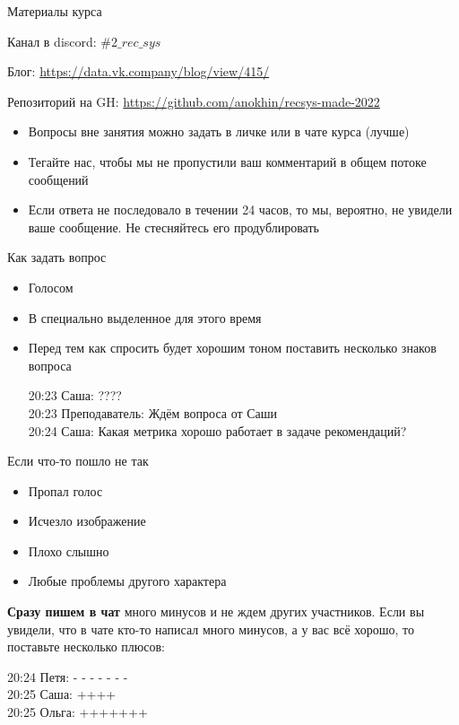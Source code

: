 \documentclass[11pt,aspectratio=169,handout]{beamer}
\begin{document}
\begin{frame}{Материалы курса}

Канал в discord: $\#2\_rec\_sys$

Блог: \url{https://data.vk.company/blog/view/415/}

Репозиторий на GH: \url{https://github.com/anokhin/recsys-made-2022}

\vfill

\begin{itemize}
\item Вопросы вне занятия можно задать в личке или в чате курса (лучше)
\item Тегайте нас, чтобы мы не пропустили ваш комментарий в общем потоке сообщений
\item Если ответа не последовало в течении 24 часов, то мы, вероятно, не увидели ваше сообщение. Не стесняйтесь его продублировать
\end{itemize}

\end{frame}

\begin{frame}{Как задать вопрос}

\begin{itemize}
\item Голосом
\item В специально выделенное для этого время
\item Перед тем как спросить будет хорошим тоном поставить несколько знаков вопроса
\begin{tcolorbox}[colback=gray!5,colframe=gray!80,title=]
20:23 Саша: ???? \\
20:23 Преподаватель: Ждём вопроса от Саши \\
20:24 Саша: Какая метрика хорошо работает в задаче рекомендаций?
\end{tcolorbox}
\end{itemize}

\end{frame}

\begin{frame}{Если что-то пошло не так}

\begin{itemize}
\item Пропал голос
\item Исчезло изображение
\item Плохо слышно
\item Любые проблемы другого характера
\end{itemize}
\vfill
{\bf Сразу пишем в чат} много минусов и не ждем других участников. Если вы увидели, что в чате кто-то написал много минусов, а у вас всё хорошо, то поставьте несколько плюсов:
\vfill
\begin{tcolorbox}[colback=gray!5,colframe=gray!80,title=]
20:24 Петя: - - - - - - -  \\
20:25 Саша: ++++ \\
20:25 Ольга: +++++++
\end{tcolorbox}

\end{frame}
\end{document}
